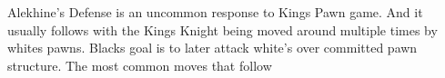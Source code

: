 \documentclass {article}
\begin{document}
\begin{multicols}{2}

\newgame
{}

\showboard

Alekhine's Defense is an uncommon response to Kings Pawn game. And it usually follows with the Kings Knight being moved around multiple times by whites pawns. Blacks goal is to later attack white's over committed pawn structure. The most common moves that follow 

\end{multicols}
\end{document}
